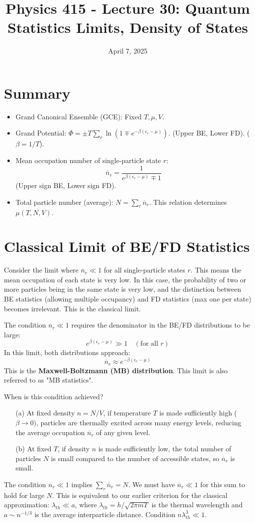 \documentclass[11pt]{article}
\title{Physics 415 - Lecture 30: Quantum Statistics Limits, Density of States}
\date{April 7, 2025}
\author{} %
\newcommand{\lambdaT}{\lambda_{th}} %
\newcommand{\eps}{\epsilon}
\newcommand{\nbar}{\overline{n}} %
\begin{document}
\maketitle
\thispagestyle{empty}

\section*{Summary}

\begin{itemize}
    \item Grand Canonical Ensemble (GCE): Fixed $T, \mu, V$.
    \item Grand Potential: $\Phi = \pm T \sum_r \ln(1 \mp e^{-\beta(\eps_r-\mu)})$. (Upper BE, Lower FD). ($\beta=1/T$).
    \item Mean occupation number of single-particle state $r$:
    \[ \nbar_r = \frac{1}{e^{\beta(\eps_r-\mu)} \mp 1} \]
    (Upper sign BE, Lower sign FD).
    \item Total particle number (average): $N = \sum_r \nbar_r$. This relation determines $\mu(T,N,V)$.
\end{itemize}

\section*{Classical Limit of BE/FD Statistics}

Consider the limit where $\nbar_r \ll 1$ for all single-particle states $r$. This means the mean occupation of each state is very low. In this case, the probability of two or more particles being in the same state is very low, and the distinction between BE statistics (allowing multiple occupancy) and FD statistics (max one per state) becomes irrelevant. This is the classical limit.

The condition $\nbar_r \ll 1$ requires the denominator in the BE/FD distributions to be large:
\[ e^{\beta(\eps_r-\mu)} \gg 1 \quad (\text{for all } r) \]
In this limit, both distributions approach:
\[ \nbar_r \approx e^{-\beta(\eps_r-\mu)} \]
This is the \textbf{Maxwell-Boltzmann (MB) distribution}. This limit is also referred to as "MB statistics".

When is this condition achieved?
\begin{itemize}
    \item[(a)] At fixed density $n=N/V$, if temperature $T$ is made sufficiently high ($\beta \to 0$), particles are thermally excited across many energy levels, reducing the average occupation $\nbar_r$ of any given level.
    \item[(b)] At fixed $T$, if density $n$ is made sufficiently low, the total number of particles $N$ is small compared to the number of accessible states, so $\nbar_r$ is small.
\end{itemize}
The condition $\nbar_r \ll 1$ implies $\sum_r \nbar_r = N$. We must have $\nbar_r \ll 1$ for this sum to hold for large $N$. This is equivalent to our earlier criterion for the classical approximation: $\lambdaT \ll a$, where $\lambdaT = h/\sqrt{2\pi m T}$ is the thermal wavelength and $a \sim n^{-1/3}$ is the average interparticle distance. Condition $n \lambdaT^3 \ll 1$.
\end{document}
